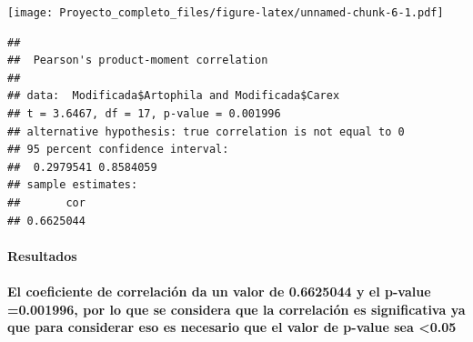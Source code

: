 \documentclass[
]{article}
\newenvironment{Shaded}{\begin{snugshade}}{\end{snugshade}}
\newcommand{\DocumentationTok}[1]{\textcolor[rgb]{0.56,0.35,0.01}{\textbf{\textit{#1}}}}
\newcommand{\FunctionTok}[1]{\textcolor[rgb]{0.13,0.29,0.53}{\textbf{#1}}}
\newcommand{\NormalTok}[1]{#1}
\newcommand{\SpecialCharTok}[1]{\textcolor[rgb]{0.81,0.36,0.00}{\textbf{#1}}}
\begin{document}
\texttt{[image: Proyecto\_completo\_files/figure-latex/unnamed-chunk-6-1.pdf]}

\begin{Shaded}
\end{Shaded}

\begin{verbatim}
## 
##  Pearson's product-moment correlation
## 
## data:  Modificada$Artophila and Modificada$Carex
## t = 3.6467, df = 17, p-value = 0.001996
## alternative hypothesis: true correlation is not equal to 0
## 95 percent confidence interval:
##  0.2979541 0.8584059
## sample estimates:
##       cor 
## 0.6625044
\end{verbatim}

\hypertarget{resultados}{%
\paragraph{Resultados}\label{resultados}}

\hypertarget{el-coeficiente-de-correlaciuxf3n-da-un-valor-de-0.6625044-y-el-p-value-0.001996-por-lo-que-se-considera-que-la-correlaciuxf3n-es-significativa-ya-que-para-considerar-eso-es-necesario-que-el-valor-de-p-value-sea-0.05}{%
\paragraph{El coeficiente de correlación da un valor de 0.6625044 y el
p-value =0.001996, por lo que se considera que la correlación es
significativa ya que para considerar eso es necesario que el valor de
p-value sea
\textless0.05}\label{el-coeficiente-de-correlaciuxf3n-da-un-valor-de-0.6625044-y-el-p-value-0.001996-por-lo-que-se-considera-que-la-correlaciuxf3n-es-significativa-ya-que-para-considerar-eso-es-necesario-que-el-valor-de-p-value-sea-0.05}}
\end{document}
